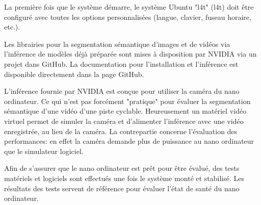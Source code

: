 \par La première fois que le système démarre, le système Ubuntu "\acrlong{l4t}" (\acrshort{l4t}) doit être configuré avec toutes les options personnalisées (langue, clavier, fuseau horaire, etc.).
\par Les librairies pour la segmentation sémantique 
d'images et de vidéos via l'inférence de modèles déjà préparée sont mises à disposition par NVIDIA via un projet dans GitHub. La documentation pour l'installation et l'inférence est disponible directement dans la page GitHub. 
\par L'inférence fournie par NVIDIA est conçue pour utiliser la caméra du nano ordinateur. Ce qui n'est pas forcément "pratique" pour évaluer la segmentation sémantique d'une vidéo d'une piste cyclable. Heureusement un matériel vidéo virtuel permet de simuler la caméra et d'alimenter l'inférence avec une vidéo enregistrée, au lieu de la caméra. La contrepartie concerne l'évaluation des performances:  en effet la caméra demande plus de puissance au nano ordinateur que le simulateur logiciel.
\par Afin de s'assurer que le nano ordinateur est prêt pour être évalué, des tests matériels et logiciels sont  effectués une fois le système monté et stabilisé. Les résultats des tests servent de référence pour évaluer l'état de santé du nano ordinateur. 